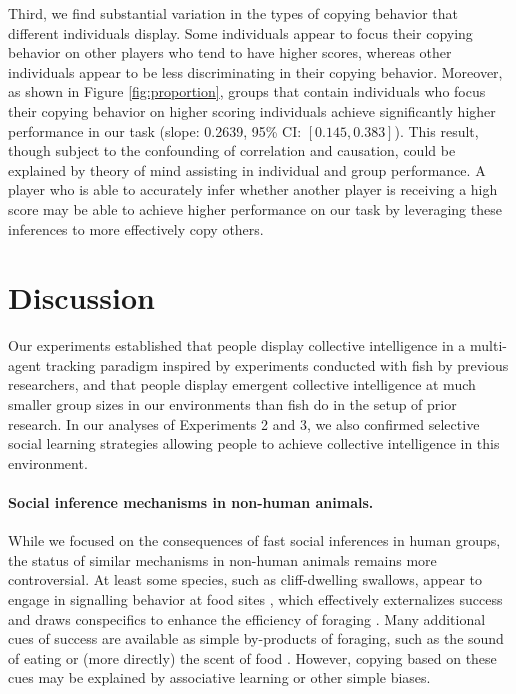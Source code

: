 \documentclass[12pt,letterpaper]{article}
\begin{document}
Third, we find substantial variation in the types of copying behavior
that different individuals display. 
Some individuals appear to focus their copying behavior on other players who tend to have higher
scores, whereas other individuals appear to be less discriminating in
their copying behavior.  Moreover, as shown in Figure
\ref{fig:proportion}, groups that contain individuals who focus their
copying behavior on higher scoring individuals achieve significantly
higher performance in our task (slope: 0.2639, 95\% CI: $[0.145,
  0.383]$).  This result, though subject to the confounding of
correlation and causation, could be explained by theory of mind
assisting in individual and group performance.  A player who is able
to accurately infer whether another player is receiving a high score
may be able to achieve higher performance on our task by leveraging
these inferences to more effectively copy others.

\section{Discussion}

Our experiments established that people display collective intelligence in a multi-agent tracking paradigm inspired by experiments conducted with fish by previous researchers, and that people display emergent collective intelligence at much smaller group sizes in our environments than fish do in the setup of prior research.  In our analyses of Experiments 2 and 3, we also confirmed selective social learning strategies allowing people to achieve collective intelligence in this environment.

\paragraph{Social inference mechanisms in non-human animals.}

While we focused on the consequences of fast social inferences in human groups, the status of similar mechanisms in non-human animals remains more controversial.
At least some species, such as cliff-dwelling swallows, appear to engage in signalling behavior at food sites \cite{brown1988social,brown1991food}, which effectively externalizes success and draws conspecifics to enhance the efficiency of foraging \cite{torney2011signalling}.
Many additional cues of success are available as simple by-products of foraging, such as the sound of eating or (more directly) the scent of food \cite{galef2001social}.
However, copying based on these cues may be explained by associative learning or other simple biases.
\end{document}
